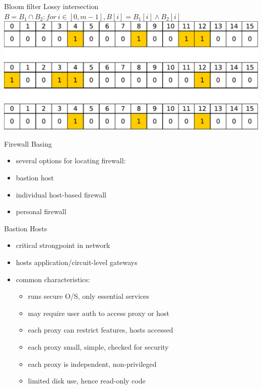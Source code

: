 \documentclass{beamer}
\begin{document}
\begin{frame}[t]{Bloom filter}
{  }
   {
  Lossy intersection\\
  $B = B_1 \cap B_2: for\ i \in [0,m-1], B[i] = B_1[i] \wedge B_2[i]$\\
  \includegraphics[width=0.8\linewidth]{bloom4}
  }
\end{frame}


\begin{frame}{Firewall Basing}
  \begin{itemize}
  \item several options for locating firewall: 
  \item bastion host 
  \item individual host-based firewall 
  \item personal firewall
  \end{itemize}
\end{frame}

\begin{frame}{Bastion Hosts}
  \begin{itemize}
  \item critical strongpoint in network 
  \item hosts application/circuit-level gateways 
  \item common characteristics: 
    \begin{itemize}
    \item runs secure O/S, only essential services 
    \item may require user auth to access proxy or host 
    \item each proxy can restrict features, hosts accessed 
    \item each proxy small, simple, checked for security 
    \item each proxy is independent, non-privileged 
    \item limited disk use, hence read-only code 
    \end{itemize}
  \end{itemize}
\end{frame}
\end{document}
